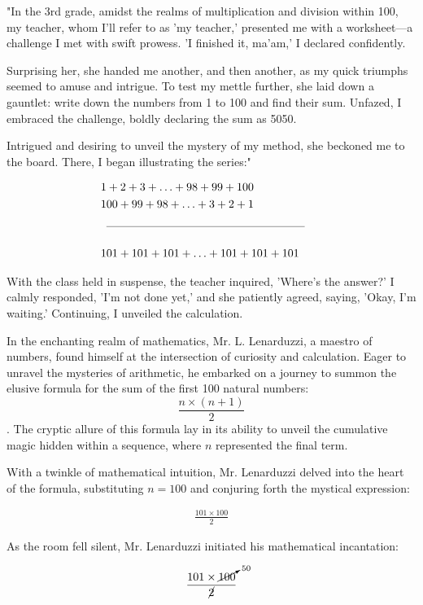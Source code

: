 \documentclass[12pt,a4paper]{article}
\begin{document}
"In the 3rd grade, amidst the realms of multiplication and division within 100, my teacher, whom I'll refer to as 'my teacher,' presented me with a worksheet—a challenge I met with swift prowess. 'I finished it, ma'am,' I declared confidently.

Surprising her, she handed me another, and then another, as my quick triumphs seemed to amuse and intrigue. To test my mettle further, she laid down a gauntlet: write down the numbers from 1 to 100 and find their sum. Unfazed, I embraced the challenge, boldly declaring the sum as 5050.

Intrigued and desiring to unveil the mystery of my method, she beckoned me to the board. There, I began illustrating the series:"

\begin{center}
    \begin{align*}
        &1+2+3+\ldots+98+99+100 \\
        &100+99+98+\ldots+3+2+1 \\
        \cmidrule(lr){1-4} &&&& \\[-1.5ex]
        &101+101+101+\ldots+101+101+101
    \end{align*}
\end{center}


With the class held in suspense, the teacher inquired, 'Where's the answer?' I calmly responded, 'I'm not done yet,' and she patiently agreed, saying, 'Okay, I'm waiting.' Continuing, I unveiled the calculation.

In the enchanting realm of mathematics, Mr. L. Lenarduzzi, a maestro of numbers, found himself at the intersection of curiosity and calculation. Eager to unravel the mysteries of arithmetic, he embarked on a journey to summon the elusive formula for the sum of the first 100 natural numbers: 
\[\frac{n \times (n+1)}{2}\]. The cryptic allure of this formula lay in its ability to unveil the cumulative magic hidden within a sequence, where \(n\) represented the final term.

With a twinkle of mathematical intuition, Mr. Lenarduzzi delved into the heart of the formula, substituting \(n = 100\) and conjuring forth the mystical expression:

\begin{align*}
    \frac{101 \times 100}{2}
\end{align*}

As the room fell silent, Mr. Lenarduzzi initiated his mathematical incantation:

\begin{align*}
    \frac{101 \times \cancelto{50}{100}}{\cancel{2}}
\end{align*}
\end{document}
